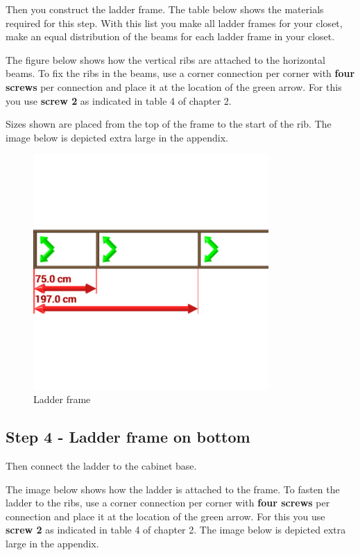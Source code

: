 \documentclass{article}
\begin{document}
Then you construct the ladder frame. The table below shows the materials required for this step. With this list you make all ladder frames for your closet, make an equal distribution of the beams for each ladder frame in your closet.



The figure below shows how the vertical ribs are attached to the horizontal beams. To fix the ribs in the beams, use a corner connection per corner with \textbf{four screws} per connection and place it at the location of the green arrow. For this you use \textbf{screw 2} as indicated in table 4 of chapter 2.

Sizes shown are placed from the top of the frame to the start of the rib. The image below is depicted extra large in the appendix.

\begin{figure}[h!]
    \centering
    \includegraphics[width=0.8\textwidth]{scene 3 - ladder.png}
    \caption{Ladder frame}
    \label{fig:stap 3}
\end{figure}

\clearpage
\newpage

\subsection{Step 4 - Ladder frame on bottom}

Then connect the ladder to the cabinet base.

The image below shows how the ladder is attached to the frame. To fasten the ladder to the ribs, use a corner connection per corner with \textbf{four screws} per connection and place it at the location of the green arrow. For this you use \textbf{screw 2} as indicated in table 4 of chapter 2.
The image below is depicted extra large in the appendix.
\end{document}
